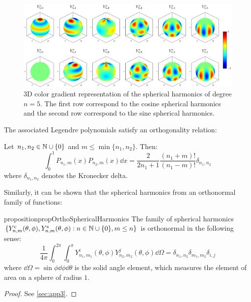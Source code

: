 \documentclass[../main.tex]{subfiles}
\begin{document}
\begin{figure}[ht]
  \centering
  \includegraphics[width=\textwidth]{Images/sphericalHarmonics.pdf}
  \caption{3D color gradient representation of the spherical harmonics of degree $n=5$. The first row correspond to the cosine spherical harmonics and the second row correspond to the sine spherical harmonics.}
\end{figure}
The associated Legendre polynomials satisfy an orthogonality relation:
\begin{lemma}\label{lem:ortho_asso_legendre}
  Let $n_1,n_2\in\mathbb{N}\cup\{0\}$ and $m\leq \min\{n_1,n_2\}$. Then:
  \begin{equation}
    \int_0^1 P_{n_1,m}(x) P_{n_2,m}(x) \dd{x}=\frac{2}{2n_1+1}\frac{(n_1+m)!}{(n_1-m)!} \delta_{n_1,n_2}
  \end{equation}
  where $\delta_{n_1,n_2}$ denotes the Kronecker delta.
\end{lemma}
Similarly, it can be shown that the spherical harmonics from an orthonormal family of functions:
\begin{restatable}{proposition}{propOrthoSphericalHarmonics}
  The family of spherical harmonics $\{Y_{n,m}^{\mathrm{c}}(\theta,\phi),Y_{n,m}^{\mathrm{s}}(\theta,\phi):n\in\mathbb{N}\cup\{0\},m\leq n\}$ is orthonormal in the following sense:
  \begin{equation}\label{eq:ortho_spherical_harmonics}
    \frac{1}{4\pi}\int_0^{2\pi}\int_0^\pi Y_{n_1,m_1}^i(\theta,\phi) Y_{n_2,m_2}^j(\theta,\phi)\dd\Omega=\delta_{n_1,n_2}\delta_{m_1,m_2}\delta_{i,j}
  \end{equation}
  where $\dd\Omega=\sin\phi\dd{\phi}\dd{\theta}$ is the solid angle element, which measures the element of area on a sphere of radius $1$.
\end{restatable}
\begin{proof}
  See \cref{sec:app3}.
\end{proof}
\end{document}
